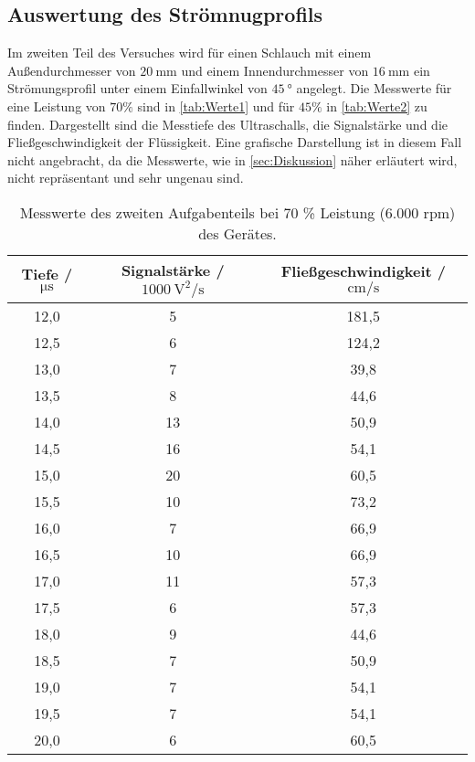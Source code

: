 \subsection{Auswertung des Strömnugprofils}
\label{subsec:StroemiProf}
Im zweiten Teil des Versuches wird für einen Schlauch mit einem Außendurchmesser von $\SI{20}{\milli\meter}$ und einem Innendurchmesser von $\SI{16}{\milli\metre}$ ein
Strömungsprofil unter einem Einfallwinkel von $\SI{45}{\degree}$ angelegt. Die Messwerte für eine Leistung von $70\%$ sind in \autoref{tab:Werte1} und für $45\%$ in 
\autoref{tab:Werte2} zu finden. Dargestellt sind die Messtiefe des Ultraschalls, die Signalstärke und die Fließgeschwindigkeit der Flüssigkeit.
Eine grafische Darstellung ist in diesem Fall nicht angebracht, da die Messwerte, wie in \autoref{sec:Diskussion} näher erläutert wird, nicht repräsentant und sehr ungenau sind.
\begin{table}[H]
  \centering
  \caption{Messwerte des zweiten Aufgabenteils bei 70 \% Leistung (6.000 rpm) des Gerätes.}
  \label{tab:Werte1}
  \begin{tabular}{c c c}
    \toprule
    Tiefe / $\si{\micro\second}$ & Signalstärke / $\SI{1000}{\square\volt\per\second}$ & Fließgeschwindigkeit / $\si{\centi\meter\per\second}$ \\
    \midrule
    12,0 & 5 & 181,5 \\
    12,5 & 6 & 124,2 \\
    13,0 & 7 & 39,8 \\
    13,5 & 8 & 44,6 \\
    14,0 & 13 & 50,9 \\
    14,5 & 16 & 54,1 \\
    15,0 & 20  & 60,5 \\
    15,5 & 10 & 73,2 \\
    16,0 & 7 & 66,9 \\
    16,5 & 10 & 66,9 \\
    17,0 & 11 & 57,3 \\
    17,5 & 6 & 57,3 \\
    18,0 & 9 & 44,6 \\
    18,5 & 7 & 50,9 \\
    19,0 & 7 & 54,1 \\
    19,5 & 7 & 54,1 \\
    20,0 & 6 & 60,5 \\
    \bottomrule
  \end{tabular}
\end{table}

